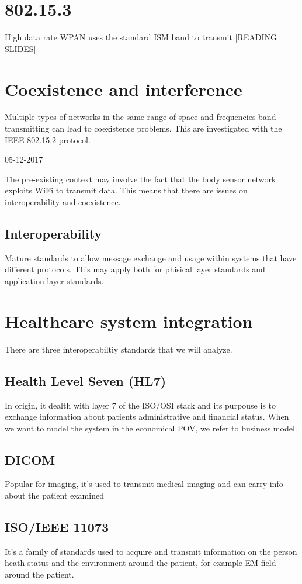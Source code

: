 \section{802.15.3}

High data rate WPAN uses the standard ISM band to transmit [READING SLIDES]


\section{Coexistence and interference}
Multiple types of networks in the same range of space and frequencies band transmitting can lead to coexistence problems. This are investigated with the IEEE 802.15.2 protocol.


05-12-2017

The pre-existing context may involve the fact that the body sensor network exploits WiFi to transmit data. This means that there are issues on interoperability and coexistence.

\subsection{Interoperability}
Mature standards to allow message exchange and usage within systems that have different protocols. This may apply both for phisical layer standards and application layer standards.
\section{Healthcare system integration}
There are three interoperabiltiy standards that we will analyze.
\subsection{Health Level Seven (HL7)}
In origin, it dealth with layer 7 of the ISO/OSI stack and its purpouse is to exchange information about patients administrative and financial status. When we want to model the system in the economical POV, we refer to business model.

\subsection{DICOM}
Popular for imaging, it's used to transmit medical imaging and can carry info about the patient examined

\subsection{ISO/IEEE 11073}
It's a family of standards used to acquire and transmit information on the person heath status and the environment around the patient, for example EM field around the patient.
